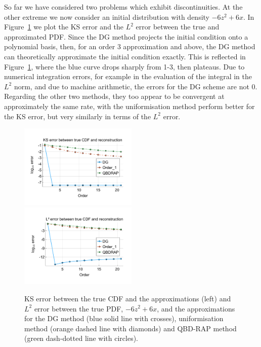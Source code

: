 So far we have considered two problems which exhibit discontinuities. At the other extreme we now consider an initial distribution with density \(-6z^2+6x\). In Figure~\ref{fig: fun 6 comp} we plot the KS error and the \(L^2\) error between the true and approximated PDF. Since the DG method projects the initial condition onto a polynomial basis, then, for an order 3 approximation and above, the DG method can theoretically approximate the initial condition exactly. This is reflected in Figure~\ref{fig: fun 6 comp}, where the blue curve drops sharply from 1-3, then plateaus. Due to numerical integration errors, for example in the evaluation of the integral in the \(L^2\) norm, and due to machine arithmetic, the errors for the DG scheme are not 0. Regarding the other two methods, they too appear to be convergent at approximately the same rate, with the uniformisation method perform better for the KS error, but very similarly in terms of the \(L^2\) error. 
\begin{figure}
	\centering
	\includegraphics[width=0.5\textwidth,trim={1.25cm 0.8cm 0.25cm 1.25cm},clip]{chapter5/figs/comp/fun6/meshs_ks_error_formatted.pdf}%
	\includegraphics[width=0.5\textwidth,trim={1.25cm 0.8cm 0.25cm 1.25cm},clip]{chapter5/figs/comp/fun6/meshs_l2_pdf_error_formatted.pdf}
	\caption{KS error between the true CDF and the approximations (left) and \(L^2\) error between the true PDF, \(-6z^2+6x\), and the approximations for the DG method (blue solid line with crosses), uniformisation method (orange dashed line with diamonds) and QBD-RAP method (green dash-dotted line with circles).}
	\label{fig: fun 6 comp} 
\end{figure}

